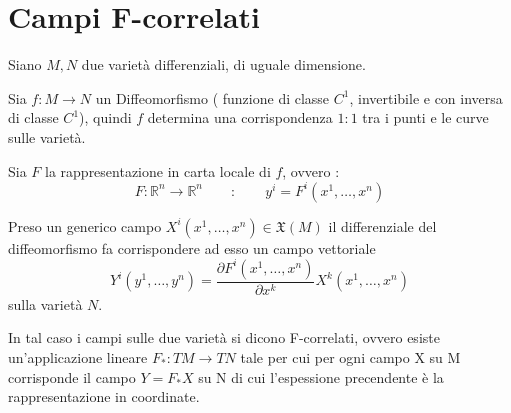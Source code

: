 \documentclass[11pt]{report}
\theoremstyle{plain}
\theoremstyle{definition}
\theoremstyle{remark}
\begin{document}
\section{Campi F-correlati}
Siano $M,N$ due varietà differenziali, di uguale dimensione.

Sia $f:M\rightarrow N$ un Diffeomorfismo ( funzione di classe $C^{1}$, invertibile e con inversa di classe $C^{1}$), quindi $f$ determina una corrispondenza $1:1$ tra i punti e le curve sulle varietà.

Sia $F$ la rappresentazione in carta locale di $f$, ovvero :
$$ F: \mathbb{R}^{n} \rightarrow \mathbb{R}^{n} \qquad : \qquad y^{i} = F^{i}(x^{1} , \ldots , x^{n})$$

Preso un generico campo $ X^{i}(x^{1}, \ldots, x^{n}) \in \mathfrak{X}(M) $ il differenziale del diffeomorfismo fa corrispondere ad esso un campo vettoriale 
$$ Y^{i}(y^{1}, \ldots, y^{n}) = \dfrac{\partial F^{i}(x^{1} , \ldots , x^{n})}{\partial x^{k}} X^{k} (x^{1} , \ldots , x^{n})$$
sulla varietà $N$.

In tal caso i campi sulle due varietà si dicono F-correlati, ovvero esiste un'applicazione lineare $F_{\ast} : TM \rightarrow TN$ tale per cui per ogni campo X su M corrisponde il campo $Y= F_{\ast}X$ su N di cui l'espessione precendente è la rappresentazione in coordinate.
\end{document}
